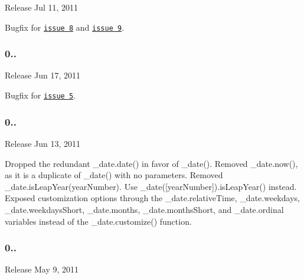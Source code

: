 \begin{DoxyItemize}
\item Release Jul 11, 2011
\end{DoxyItemize}

Bugfix for \href{https://github.com/timrwood/underscore.date/pull/8}{\tt issue 8} and \href{https://github.com/timrwood/underscore.date/pull/9}{\tt issue 9}.

\subsubsection*{0..}


\begin{DoxyItemize}
\item Release Jun 17, 2011
\end{DoxyItemize}

Bugfix for \href{https://github.com/timrwood/underscore.date/pull/5}{\tt issue 5}.

\subsubsection*{0..}


\begin{DoxyItemize}
\item Release Jun 13, 2011
\end{DoxyItemize}

Dropped the redundant {\ttfamily \+\_\+date.\+date()} in favor of {\ttfamily \+\_\+date()}. Removed {\ttfamily \+\_\+date.\+now()}, as it is a duplicate of {\ttfamily \+\_\+date()} with no parameters. Removed {\ttfamily \+\_\+date.\+is\+Leap\+Year(year\+Number)}. Use {\ttfamily \+\_\+date(\mbox{[}year\+Number\mbox{]}).is\+Leap\+Year()} instead. Exposed customization options through the {\ttfamily \+\_\+date.\+relative\+Time}, {\ttfamily \+\_\+date.\+weekdays}, {\ttfamily \+\_\+date.\+weekdays\+Short}, {\ttfamily \+\_\+date.\+months}, {\ttfamily \+\_\+date.\+months\+Short}, and {\ttfamily \+\_\+date.\+ordinal} variables instead of the {\ttfamily \+\_\+date.\+customize()} function.

\subsubsection*{0..}


\begin{DoxyItemize}
\item Release May 9, 2011
\end{DoxyItemize}

